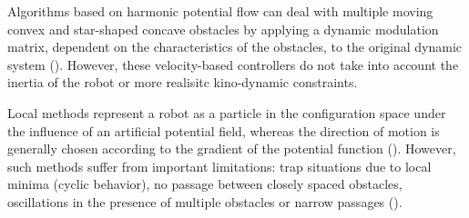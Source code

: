Algorithms based on harmonic potential flow can deal with multiple moving convex and star-shaped concave obstacles by applying a dynamic modulation matrix, dependent on the characteristics of the obstacles, to the original dynamic system (\cite{khansari2012dynamical, huber2019avoidance}). However, these velocity-based controllers do
not take into account the inertia of the robot or more realisitc kino-dynamic constraints.

Local methods represent a robot as a particle in the configuration space under the influence of an artificial potential field, whereas the direction of motion is generally chosen according to the gradient of the potential function (\cite{Latombe1991,warren1990multiple}). However, such methods suffer from important limitations: trap situations due to local minima (cyclic behavior), no passage between closely spaced obstacles, oscillations in the presence of multiple obstacles or narrow passages (\cite{koren1991potential}).


